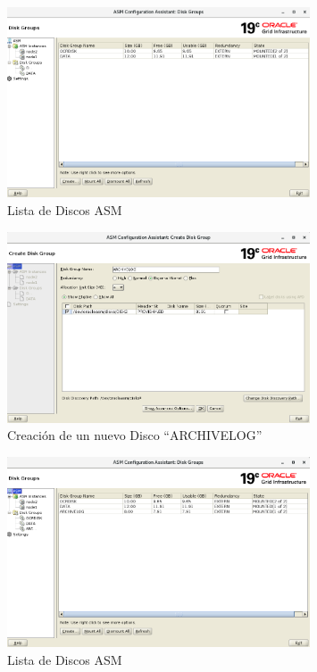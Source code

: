 \documentclass{article}
\begin{document}
\begin{figure}[H]
		\begin{center}
			\includegraphics[width=0.80\textwidth]{db_creation_1_asm_disk_creation_3_ready.png}
		\end{center}
		\caption{Lista de Discos ASM}
\end{figure}

\begin{figure}[H]
		\begin{center}
			\includegraphics[width=0.80\textwidth]{db_creation_1_asm_disk_creation_4_archive_log.png}
		\end{center}
		\caption{Creación de un nuevo Disco ``ARCHIVELOG''}
\end{figure}

\begin{figure}[H]
		\begin{center}
			\includegraphics[width=0.80\textwidth]{db_creation_1_asm_disk_creation_5_ready.png}
		\end{center}
		\caption{Lista de Discos ASM}
\end{figure}
\end{document}
